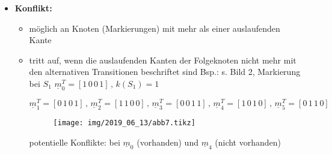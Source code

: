 \begin{itemize}[align=left]
	
	
	\item{\textbf{Konflikt:}} 
	\begin{itemize}
		\item möglich an Knoten (Markierungen) mit mehr als einer auslaufenden Kante
		\item tritt auf, wenn die auslaufenden Kanten der Folgeknoten nicht mehr mit den alternativen Transitionen beschriftet sind  %
		Bsp.: s. Bild 2, Markierung bei $S_1$
		$\underline{m}_0^{T} = [1\, 0\, 0\,  1] \, , \, k(S_1) = 1$
		
		$\underline{m}_1^{T} = [0\, 1\, 0\,  1] \, , \, \underline{m}_2^{T} = [1\, 1\, 0\,  0] \, , \,\underline{m}_3^{T} = [0\, 0\, 1\,  1] \, , \, \underline{m}_4^{T} = [1\, 0\, 1\,  0] \, , \, \underline{m}_5^{T} = [0\, 1\, 1\,  0] $
		\begin{figure}[H]
			\centering
			\texttt{[image: img/2019\_06\_13/abb7.tikz]}
		\end{figure}
		
		potentielle Konflikte: bei $\underline{m}_0$ (vorhanden) und $\underline{m}_4$ (nicht vorhanden)
	\end{itemize}

\end{itemize}


